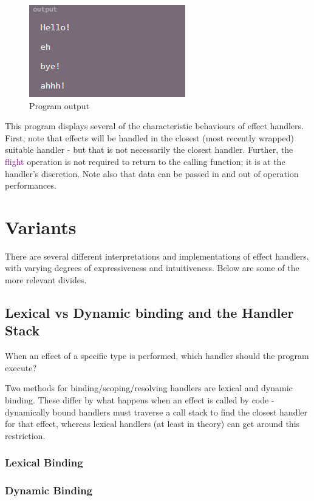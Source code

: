 \documentclass[logo,bsc,singlespacing,parskip,online]{infthesis}
\begin{document}
\begin{figure}[h]
    \centering
    \includegraphics[width=0.5\linewidth]{effekt_2_out.png}
    \caption{Program output}
\end{figure}

This program displays several of the characteristic behaviours of effect handlers. First, note that effects will be handled in the closest (most recently wrapped) suitable handler - but that is not necessarily the closest handler. Further, the \textcolor{purple}{flight} operation is not required to return to the calling function; it is at the handler's discretion. Note also that data can be passed in and out of operation performances.


\section{Variants}
There are several different interpretations and implementations of effect handlers, with varying degrees of expressiveness and intuitiveness. Below are some of the more relevant divides.

\subsection{Lexical vs Dynamic binding and the Handler Stack}

When an effect of a specific type is performed, which handler should the program execute? 

Two methods for binding/scoping/resolving handlers are lexical and dynamic binding. These differ by what happens when an effect is called by code - dynamically bound handlers must traverse a call stack to find the closest handler for that effect, whereas lexical handlers (at least in theory) can get around this restriction. 

\subsubsection{Lexical Binding}



\subsubsection{Dynamic Binding}
\end{document}
